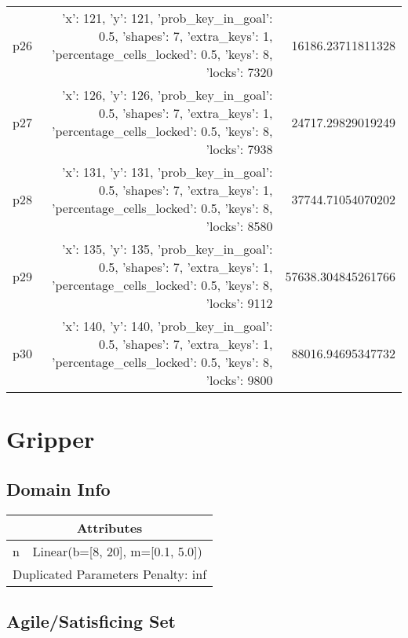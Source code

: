 \documentclass{article}
\begin{document}
\begin{center}
\begin{tabular}{r|r|r}
  p26&{'x': 121, 'y': 121, 'prob\_key\_in\_goal': 0.5, 'shapes': 7, 'extra\_keys': 1, 'percentage\_cells\_locked': 0.5, 'keys': 8, 'locks': 7320}&16186.23711811328\\
  p27&{'x': 126, 'y': 126, 'prob\_key\_in\_goal': 0.5, 'shapes': 7, 'extra\_keys': 1, 'percentage\_cells\_locked': 0.5, 'keys': 8, 'locks': 7938}&24717.29829019249\\
  p28&{'x': 131, 'y': 131, 'prob\_key\_in\_goal': 0.5, 'shapes': 7, 'extra\_keys': 1, 'percentage\_cells\_locked': 0.5, 'keys': 8, 'locks': 8580}&37744.71054070202\\
  p29&{'x': 135, 'y': 135, 'prob\_key\_in\_goal': 0.5, 'shapes': 7, 'extra\_keys': 1, 'percentage\_cells\_locked': 0.5, 'keys': 8, 'locks': 9112}&57638.304845261766\\
  p30&{'x': 140, 'y': 140, 'prob\_key\_in\_goal': 0.5, 'shapes': 7, 'extra\_keys': 1, 'percentage\_cells\_locked': 0.5, 'keys': 8, 'locks': 9800}&88016.94695347732
                            \end{tabular}
                            \end{center}
                    
                            \newpage \section{Gripper}
                    \subsection*{Domain Info}

                    \begin{center}
                    \begin{tabular}{p{}p{}}
                    \multicolumn{2}{c}{\bf \large Attributes}\\\midrule
                    n & Linear(b=[8, 20], m=[0.1, 5.0])
                    
                     \\\midrule
                    \multicolumn{2}{l}{Duplicated Parameters Penalty: inf}
                    \end{tabular}
                    \end{center}
                
                         \subsection*{Agile/Satisficing Set}
\end{document}

